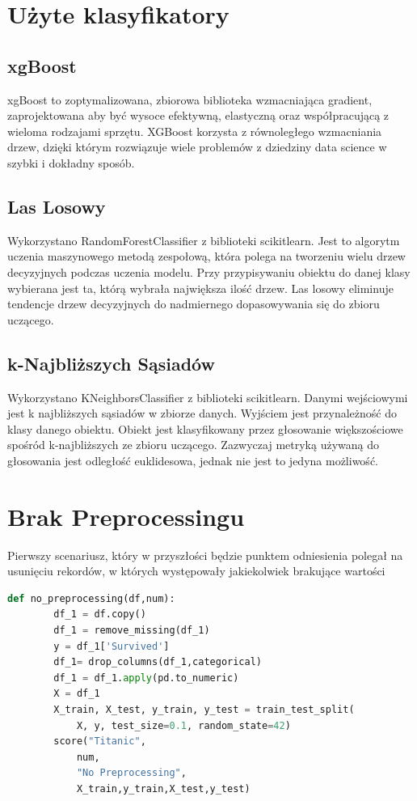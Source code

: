 \documentclass{book}
\begin{document}
\section{Użyte klasyfikatory}
\subsection{xgBoost}
xgBoost to zoptymalizowana, zbiorowa biblioteka wzmacniająca gradient, zaprojektowana aby być wysoce
efektywną, elastyczną oraz współpracującą z wieloma rodzajami sprzętu. XGBoost korzysta z równoległego wzmacniania drzew, 
dzięki którym rozwiązuje wiele problemów z dziedziny data science w szybki i dokładny sposób. \cite{xgBoost}

\subsection{Las Losowy}
Wykorzystano RandomForestClassifier z biblioteki scikit\-learn. 
Jest to algorytm uczenia maszynowego metodą zespołową, 
która polega na tworzeniu wielu drzew decyzyjnych podczas 
uczenia modelu. Przy przypisywaniu obiektu do danej klasy wybierana
jest ta, którą wybrała największa ilość drzew. Las losowy eliminuje 
tendencje drzew decyzyjnych do nadmiernego dopasowywania się do zbioru
uczącego. \cite{random forest}

\subsection{k-Najbliższych Sąsiadów}
Wykorzystano KNeighborsClassifier z biblioteki 
scikit\-learn. Danymi wejściowymi jest k 
najbliższych sąsiadów w zbiorze danych. Wyjściem 
jest przynależność do klasy danego obiektu. Obiekt 
jest klasyfikowany przez głosowanie większościowe 
spośród k-najbliższych ze zbioru uczącego. Zazwyczaj 
metryką używaną do głosowania jest odległość euklidesowa, 
jednak nie jest to jedyna możliwość. \cite{k-nearest neighbors}

\section{Brak Preprocessingu}
Pierwszy scenariusz, który w przyszłości 
będzie punktem odniesienia polegał na usunięciu rekordów, 
w których występowały jakiekolwiek brakujące wartości

\begin{lstlisting}[language=Python, caption={Brak przygotowania
     danych dla zbioru danych Titanic}, captionpos=b]
    def no_preprocessing(df,num):
        df_1 = df.copy()
        df_1 = remove_missing(df_1)
        y = df_1['Survived']
        df_1= drop_columns(df_1,categorical)
        df_1 = df_1.apply(pd.to_numeric)
        X = df_1
        X_train, X_test, y_train, y_test = train_test_split(
            X, y, test_size=0.1, random_state=42)
        score("Titanic",
            num,
            "No Preprocessing",
            X_train,y_train,X_test,y_test)
    \end{lstlisting}
\end{document}
